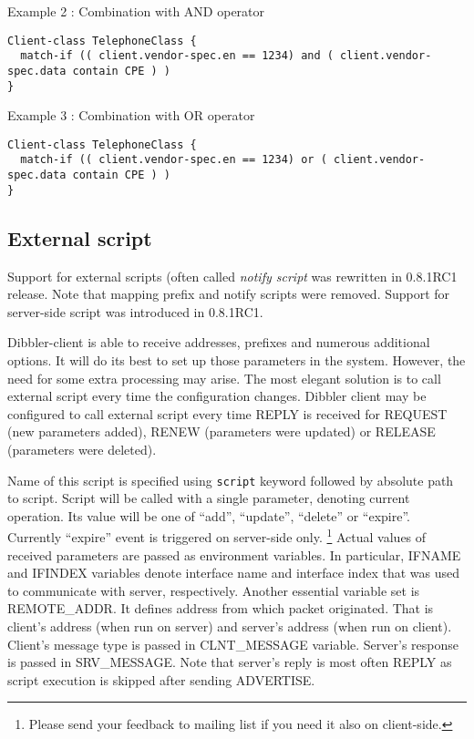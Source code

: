 Example 2 : Combination with AND operator
\begin{lstlisting}
Client-class TelephoneClass {
  match-if (( client.vendor-spec.en == 1234) and ( client.vendor-spec.data contain CPE ) )
}
\end{lstlisting}

Example 3 : Combination with OR operator
\begin{lstlisting}
Client-class TelephoneClass {
  match-if (( client.vendor-spec.en == 1234) or ( client.vendor-spec.data contain CPE ) )
}
\end{lstlisting}

\subsection{External script}
\label{feature-script}

\Note Support for external scripts (often called \emph{notify script}
  was rewritten in 0.8.1RC1 release. Note that mapping prefix and
notify scripts were removed. Support for server-side script was
introduced in 0.8.1RC1.

Dibbler-client is able to receive addresses, prefixes and numerous
additional options. It will do its best to set up those parameters in
the system. However, the need for some extra processing may arise. The
most elegant solution is to call external script every time the
configuration changes. Dibbler client may be configured to call
external script every time REPLY is received for REQUEST (new
parameters added), RENEW (parameters were updated) or RELEASE
(parameters were deleted).

Name of this script is specified using \verb+script+ keyword followed
by absolute path to script. Script will be called with a single
parameter, denoting current operation. Its value will be one of
``add'', ``update'', ``delete'' or ``expire''. Currently ``expire''
event is triggered on server-side only. \footnote{Please send your
feedback to mailing list if you need it also on client-side.} Actual
values of received parameters are passed as environment variables. In
particular, IFNAME and IFINDEX variables denote interface name and
interface index that was used to communicate with server,
respectively. Another essential variable set is REMOTE\_ADDR. It
defines address from which packet originated. That is client's address
(when run on server) and server's address (when run on
client). Client's message type is passed in CLNT\_MESSAGE
variable. Server's response is passed in SRV\_MESSAGE. Note that
server's reply is most often REPLY as script execution is skipped after
sending ADVERTISE.

